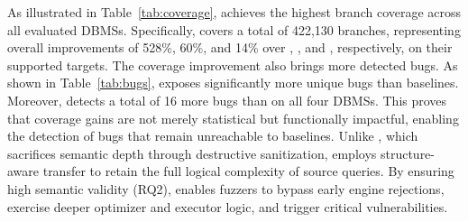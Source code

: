 \documentclass[sigconf,review,anonymous]{acmart}
\begin{document}
As illustrated in Table~\ref{tab:coverage}, \tool{} achieves the highest branch coverage across all evaluated DBMSs. Specifically, \tool{} covers a total of 422,130 branches, representing overall improvements of 528\%, 60\%, and 14\% over \sqlancer{}, \squirrel{}, and \sedar{}, respectively, on their supported targets. 
The coverage improvement also brings more detected bugs.
As shown in Table~\ref{tab:bugs}, \tool{} exposes significantly more unique bugs than baselines. 
Moreover, \tool{} detects a total of 16 more bugs than \sedar{} on all four DBMSs. 
This proves that coverage gains are not merely statistical but functionally impactful, enabling the detection of bugs that remain unreachable to baselines.
Unlike \sedar{}, which sacrifices semantic depth through destructive sanitization, \tool{} employs structure-aware transfer to retain the full logical complexity of source queries. By ensuring high semantic validity (RQ2), \tool{} enables fuzzers to bypass early engine rejections, exercise deeper optimizer and executor logic, and trigger critical vulnerabilities.


        
\end{document}
